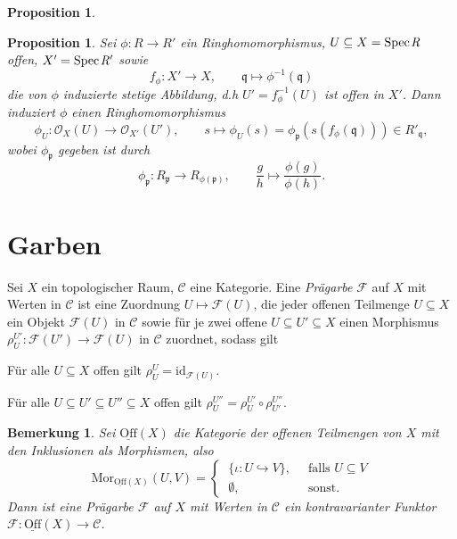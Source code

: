 \documentclass[11pt]{book}
\newtheorem{proposition}[theorem]{Proposition}
\newtheorem{remark}[theorem]{Bemerkung}
\theoremstyle{nonumberbreak}
\newenvironment{defin}[1][]{\ifthenelse{\equal{#1}{}}{\definition}{\definition[#1]}\rm}{\enddefinition}
\newenvironment{pr}[1][]{\ifthenelse{\equal{#1}{}}{\proof}{\proof[#1]}\rm}{\endproof}
\newcommand{\spec}{\mathrm{Spec} \hspace{1pt} }
\newcommand{\p}{\mathfrak{p}}
\newcommand{\q}{\mathfrak{q}}
\begin{document}
\begin{spacing}{1.4}
\begin{proposition}
\begin{pr}
\end{pr}


\end{proposition}


\begin{proposition}    %
Sei $\phi: R \longrightarrow R'$ ein Ringhomomorphismus, $U \subseteq X = \spec\it{R}$ offen, $X' = \spec\it{R'}$ sowie 
$$f_{\phi}: X' \longrightarrow X, \qquad \q \mapsto \phi^{-1}(\q)$$
die von $\phi$ induzierte stetige Abbildung, d.h $U'= f_{\phi}^{-1}(U)$ ist offen in $X'$. Dann induziert $\phi$ einen Ringhomomorphismus
$$\phi_U: \mathcal{O}_X(U) \longrightarrow \mathcal{O}_{X'}(U'), \qquad s \mapsto \phi_U(s) = \phi_{\p} \left( s \left( f_{\phi}(\q) \right) \right) \in R'_{\q},$$
wobei $\phi_{\p}$ gegeben ist durch 
$$\phi_{\p}: R_{\p} \longrightarrow R_{\phi(\p)}, \qquad \frac{g}{h} \mapsto \frac{\phi(g)}{\phi(h)}.$$
\end{proposition}


\renewcommand*\thesection{§ \arabic{section}\quad}
\section{Garben} %
\renewcommand*\thesection{\arabic{section}}

\begin{defin}   %
 Sei $X$ ein topologischer Raum, $\mathcal{C}$ eine Kategorie. Eine \textit{Prägarbe} $\mathcal{F}$ auf $X$ mit Werten in $\mathcal{C}$ ist eine Zuordnung $U \mapsto \mathcal{F}(U)$, die jeder offenen Teilmenge $U \subseteq X$ ein Objekt $\mathcal{F}(U)$ in $\mathcal{C}$ sowie für je zwei offene $U\subseteq U' \subseteq X$ einen Morphismus $\rho^{U'}_U: \mathcal{F}(U') \longrightarrow \mathcal{F}(U)$ in $\mathcal{C}$ zuordnet, sodass gilt
\begin{compactenum}
\item Für alle $U \subseteq X$ offen gilt $\rho^{U}_U = \textrm{id}_{\mathcal{F}(U)}$.
\item Für alle $U \subseteq U' \subseteq U'' \subseteq X$ offen gilt $\rho^{U''}_U = \rho^{U'}_{U} \circ \rho^{U''}_{U'}$.
\end{compactenum}
\end{defin}

\begin{remark}  %
Sei $\underline{\text{Off}}(X)$ die Kategorie der offenen Teilmengen von $X$ mit den Inklusionen als Morphismen, also 
$$\mathrm{Mor}_{\underline{\mathrm{Off}}(X)}(U,V) = \begin{cases} \ \{ \iota: U \hookrightarrow V \}, & \ \textrm{ falls }U \subseteq V \\ \ \emptyset, & \ \textrm{ sonst.} \end{cases} $$
Dann ist eine Prägarbe $\mathcal{F}$ auf $X$ mit Werten in $\mathcal{C}$ ein kontravarianter Funktor $\mathcal{F}: \underline{\text{Off}}(X) \longrightarrow \mathcal{C}$.
\end{remark}


\end{spacing}
\end{document}
